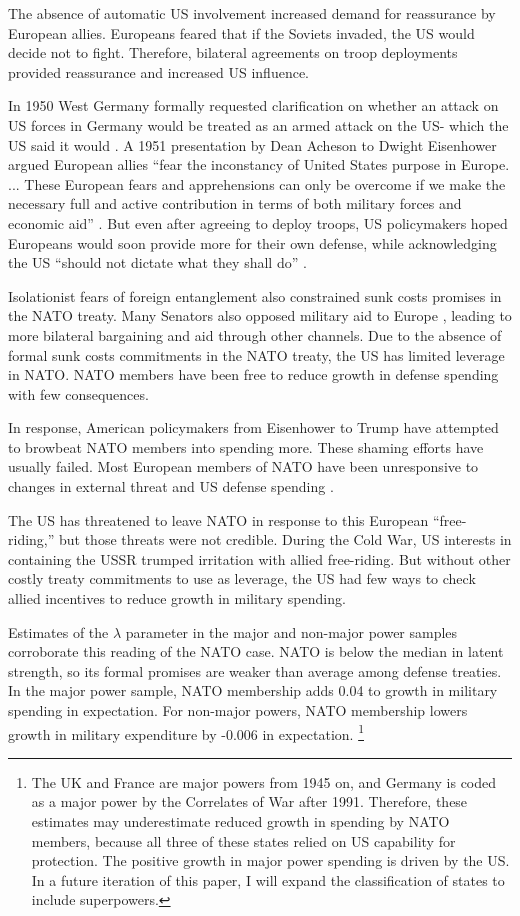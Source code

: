 \documentclass[12pt]{article}
\begin{document}
The absence of automatic US involvement increased demand for reassurance by European allies. 
Europeans feared that if the Soviets invaded, the US would decide not to fight. 
Therefore, bilateral agreements on troop deployments provided reassurance and increased US influence. 


In 1950 West Germany formally requested clarification on whether an attack on US forces in Germany would be treated as an armed attack on the US- which the US said it would \citep[pg. 395]{Acheson1969}. 
A 1951 presentation by Dean Acheson to Dwight Eisenhower argued European allies ``fear the inconstancy of United States purpose in Europe. ... These European fears and apprehensions can only be overcome if we make the necessary full and active contribution in terms of both military forces and economic aid'' \citep[pg. 3]{Acheson1951}.  
But even after agreeing to deploy troops, US policymakers hoped Europeans would soon provide more for their own defense, while acknowledging the US ``should not dictate what they shall do'' \citep[pg. 2]{Johnson1950}. 


Isolationist fears of foreign entanglement also constrained sunk costs promises in the NATO treaty. 
Many Senators also opposed military aid to Europe \citep[pg 285]{Acheson1969}, leading to more bilateral bargaining and aid through other channels. 
Due to the absence of formal sunk costs commitments in the NATO treaty, the US has limited leverage in NATO. 
NATO members have been free to reduce growth in defense spending with few consequences. 


In response, American policymakers from Eisenhower to Trump have attempted to browbeat NATO members into spending more. 
These shaming efforts have usually failed. 
Most European members of NATO have been unresponsive to changes in external threat and US defense spending \citep{PluemperNeumayer2015}. 


The US has threatened to leave NATO in response to this European ``free-riding,'' but those threats were not credible. 
During the Cold War, US interests in containing the USSR trumped irritation with allied free-riding.  
But without other costly treaty commitments to use as leverage, the US had few ways to check allied incentives to reduce growth in military spending. 


Estimates of the $\lambda$ parameter in the major and non-major power samples corroborate this reading of the NATO case. 
NATO is below the median in latent strength, so its formal promises are weaker than average among defense treaties. 
In the major power sample, NATO membership adds 0.04 to growth in military spending in expectation.
For non-major powers, NATO membership lowers growth in military expenditure by -0.006 in expectation.
\footnote{The UK and France are major powers from 1945 on, and Germany is coded as a major power by the Correlates of War after 1991. Therefore, these estimates may underestimate reduced growth in spending by NATO members, because all three of these states relied on US capability for protection. The positive growth in major power spending is driven by the US. In a future iteration of this paper, I will expand the classification of states to include superpowers.}
\end{document}
